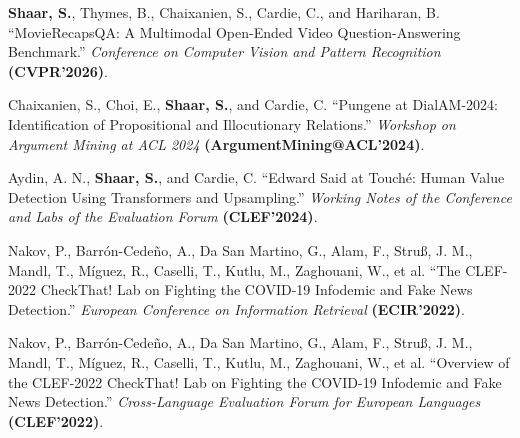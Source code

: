 \begin{publist}
  \item \textbf{Shaar, S.}, Thymes, B., Chaixanien, S., Cardie, C., and Hariharan, B. ``MovieRecapsQA: A Multimodal Open-Ended Video Question-Answering Benchmark.'' \textit{Conference on Computer Vision and Pattern Recognition} \textbf{(CVPR'2026)}.

  \item Chaixanien, S., Choi, E., \textbf{Shaar, S.}, and Cardie, C. ``Pungene at DialAM-2024: Identification of Propositional and Illocutionary Relations.'' \textit{Workshop on Argument Mining at ACL 2024} \textbf{(ArgumentMining@ACL'2024)}.

  \item Aydin, A. N., \textbf{Shaar, S.}, and Cardie, C. ``Edward Said at Touch\'e: Human Value Detection Using Transformers and Upsampling.'' \textit{Working Notes of the Conference and Labs of the Evaluation Forum} \textbf{(CLEF'2024)}.

  \item Nakov, P., Barr\'on-Cede\~no, A., Da San Martino, G., Alam, F., Stru{\ss}, J. M., Mandl, T., M\'iguez, R., Caselli, T., Kutlu, M., Zaghouani, W., et al. ``The CLEF-2022 CheckThat! Lab on Fighting the COVID-19 Infodemic and Fake News Detection.'' \textit{European Conference on Information Retrieval} \textbf{(ECIR'2022)}.

  \item Nakov, P., Barr\'on-Cede\~no, A., Da San Martino, G., Alam, F., Stru{\ss}, J. M., Mandl, T., M\'iguez, R., Caselli, T., Kutlu, M., Zaghouani, W., et al. ``Overview of the CLEF-2022 CheckThat! Lab on Fighting the COVID-19 Infodemic and Fake News Detection.'' \textit{Cross-Language Evaluation Forum for European Languages} \textbf{(CLEF'2022)}.




\end{publist}
